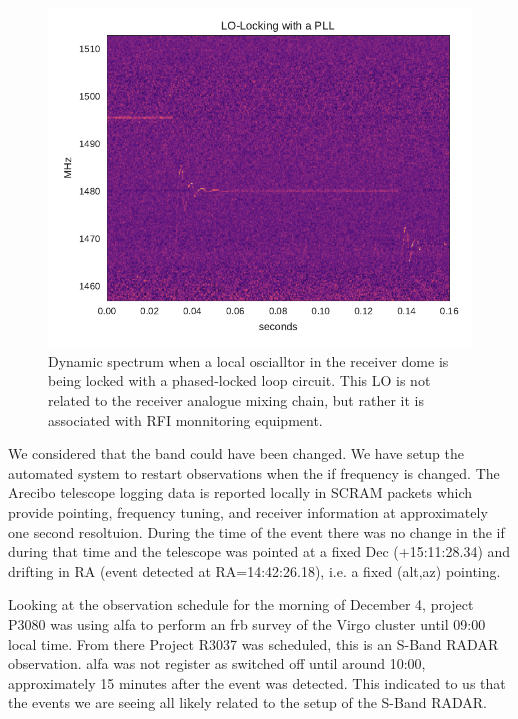 \documentclass[a4paper,fleqn,usenatbib]{mnras}
\begin{document}
%
\begin{figure}
    \includegraphics[width=1.0\linewidth]{figures/pll_spectrum.pdf}
    \caption{Dynamic spectrum when a local oscialltor in the receiver dome is
    being locked with a phased-locked loop circuit. This LO is not related to
    the receiver analogue mixing chain, but rather it is associated with RFI
    monnitoring equipment.
    }
    \label{fig:pll_spectrum}
\end{figure}
%

We considered that the band could have been changed. We have setup the automated
system to restart observations when the \gls{if} frequency is changed. The
Arecibo telescope logging data is reported locally in SCRAM packets which
provide pointing, frequency tuning, and receiver information at approximately
one second resoltuion. During the time of the event there was no change in the
\gls{if} during that time and the telescope was pointed at a fixed Dec
(+15:11:28.34) and drifting in RA (event detected at RA=14:42:26.18), i.e. a
fixed (alt,az) pointing.

Looking at the observation schedule for the morning of December 4, project P3080
was using \gls{alfa} to perform an \gls{frb} survey of the Virgo cluster until
09:00 local time. From there Project R3037 was scheduled, this is an S-Band
RADAR observation. \gls{alfa} was not register as switched off until around
10:00, approximately 15 minutes after the event was detected. This indicated to
us that the events we are seeing all likely related to the setup of the S-Band
RADAR.
\end{document}
